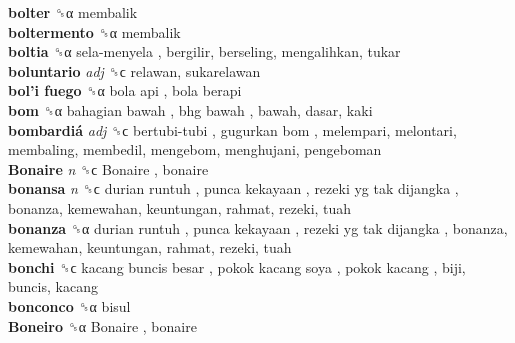 \textbf{bolter} ␝α  membalik  \\
\textbf{boltermento} ␝α  membalik  \\
\textbf{boltia} ␝α   sela-menyela , bergilir, berseling, mengalihkan, tukar  \\
\textbf{boluntario} \emph{adj}  ␝ϲ  relawan, sukarelawan  \\
\textbf{bol’i fuego} ␝α   bola api ,  bola berapi   \\
\textbf{bom} ␝α   bahagian bawah ,  bhg bawah , bawah, dasar, kaki  \\
\textbf{bombardiá} \emph{adj}  ␝ϲ   bertubi-tubi ,  gugurkan bom , melempari, melontari, membaling, membedil, mengebom, menghujani, pengeboman  \\
\textbf{Bonaire} \emph{n}  ␝ϲ   Bonaire , bonaire  \\
\textbf{bonansa} \emph{n}  ␝ϲ   durian runtuh ,  punca kekayaan ,  rezeki yg tak dijangka , bonanza, kemewahan, keuntungan, rahmat, rezeki, tuah  \\
\textbf{bonanza} ␝α   durian runtuh ,  punca kekayaan ,  rezeki yg tak dijangka , bonanza, kemewahan, keuntungan, rahmat, rezeki, tuah  \\
\textbf{bonchi} ␝ϲ   kacang buncis besar ,  pokok kacang soya ,  pokok kacang , biji, buncis, kacang  \\
\textbf{bonconco} ␝α  bisul  \\
\textbf{Boneiro} ␝α   Bonaire , bonaire  \\
